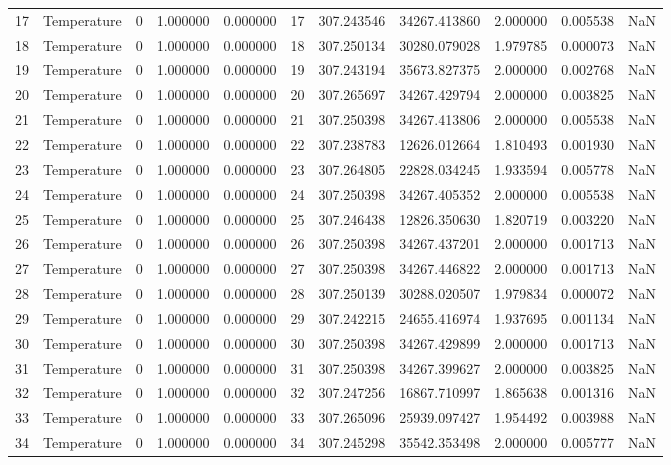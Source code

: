 \begin{tabular}{llrrrrrrrrr}
17 & Temperature & 0 & 1.000000 & 0.000000 & 17 & 307.243546 & 34267.413860 & 2.000000 & 0.005538 & NaN \\
18 & Temperature & 0 & 1.000000 & 0.000000 & 18 & 307.250134 & 30280.079028 & 1.979785 & 0.000073 & NaN \\
19 & Temperature & 0 & 1.000000 & 0.000000 & 19 & 307.243194 & 35673.827375 & 2.000000 & 0.002768 & NaN \\
20 & Temperature & 0 & 1.000000 & 0.000000 & 20 & 307.265697 & 34267.429794 & 2.000000 & 0.003825 & NaN \\
21 & Temperature & 0 & 1.000000 & 0.000000 & 21 & 307.250398 & 34267.413806 & 2.000000 & 0.005538 & NaN \\
22 & Temperature & 0 & 1.000000 & 0.000000 & 22 & 307.238783 & 12626.012664 & 1.810493 & 0.001930 & NaN \\
23 & Temperature & 0 & 1.000000 & 0.000000 & 23 & 307.264805 & 22828.034245 & 1.933594 & 0.005778 & NaN \\
24 & Temperature & 0 & 1.000000 & 0.000000 & 24 & 307.250398 & 34267.405352 & 2.000000 & 0.005538 & NaN \\
25 & Temperature & 0 & 1.000000 & 0.000000 & 25 & 307.246438 & 12826.350630 & 1.820719 & 0.003220 & NaN \\
26 & Temperature & 0 & 1.000000 & 0.000000 & 26 & 307.250398 & 34267.437201 & 2.000000 & 0.001713 & NaN \\
27 & Temperature & 0 & 1.000000 & 0.000000 & 27 & 307.250398 & 34267.446822 & 2.000000 & 0.001713 & NaN \\
28 & Temperature & 0 & 1.000000 & 0.000000 & 28 & 307.250139 & 30288.020507 & 1.979834 & 0.000072 & NaN \\
29 & Temperature & 0 & 1.000000 & 0.000000 & 29 & 307.242215 & 24655.416974 & 1.937695 & 0.001134 & NaN \\
30 & Temperature & 0 & 1.000000 & 0.000000 & 30 & 307.250398 & 34267.429899 & 2.000000 & 0.001713 & NaN \\
31 & Temperature & 0 & 1.000000 & 0.000000 & 31 & 307.250398 & 34267.399627 & 2.000000 & 0.003825 & NaN \\
32 & Temperature & 0 & 1.000000 & 0.000000 & 32 & 307.247256 & 16867.710997 & 1.865638 & 0.001316 & NaN \\
33 & Temperature & 0 & 1.000000 & 0.000000 & 33 & 307.265096 & 25939.097427 & 1.954492 & 0.003988 & NaN \\
34 & Temperature & 0 & 1.000000 & 0.000000 & 34 & 307.245298 & 35542.353498 & 2.000000 & 0.005777 & NaN \\

\end{tabular}
